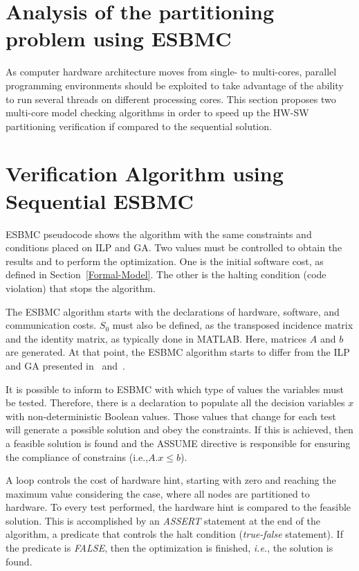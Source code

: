 \section{Analysis of the partitioning problem using ESBMC}
\label{Analysis-of-the-partitioning-problem-using-ESBMC}

As computer hardware architecture moves from single- to multi-cores, parallel programming environments should be exploited to take advantage of the ability to run several threads on different processing cores. This section proposes two multi-core model checking algorithms in order to speed up the HW-SW partitioning verification if compared to the sequential solution.

\section{Verification Algorithm using Sequential ESBMC}
\label{Verification-Algorithm-using-ESBMC}

ESBMC pseudocode shows the algorithm with the same constraints and conditions placed on ILP and GA. Two values must be controlled to obtain the results and to perform the optimization. One is the initial software cost, as defined in Section~\ref{Formal-Model}. The other is the halting condition (code violation) that stops the algorithm.

The ESBMC algorithm starts with the declarations of hardware, software, and communication costs. $S_0$ must also be defined, as the transposed incidence matrix and the identity matrix, as typically done in MATLAB. Here, matrices $A$ and $b$ are generated. At that point, the ESBMC algorithm starts to differ from the ILP and GA presented in~\cite{Trindade2015} and~\cite{Trindade2014}.

It is possible to inform to ESBMC with which type of values the variables must be tested. Therefore, there is a declaration to populate all the decision variables $x$ with non-deterministic Boolean values. Those values that change for each test will generate a possible solution and obey the constraints. If this is achieved, then a feasible solution is found and the ASSUME directive is responsible for ensuring the compliance of constrains (i.e.,$A.x \leq b$).

A loop controls the cost of hardware hint, starting with zero and reaching the maximum value considering the case, where all nodes are partitioned to hardware. To every test performed, the hardware hint is compared to the feasible solution. This is accomplished by an \textit{ASSERT} statement at the end of the algorithm, a predicate that controls the halt condition (\textit{true-false} statement). If the predicate is \textit{FALSE}, then the optimization is finished, {\it i.e.}, the solution is found. 

